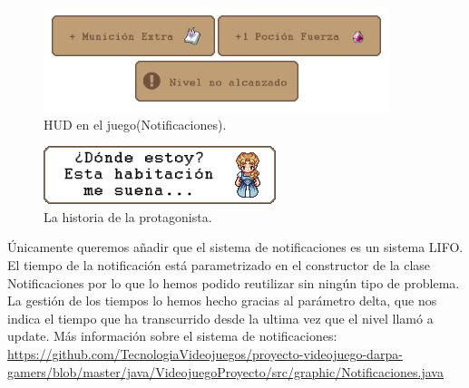 \begin{figure}[!htb]
  \centering
    \includegraphics{./img/8.JPG}
    \caption{HUD en el juego(Notificaciones).}
  \label{fig:yo}
\end{figure}
\begin{figure}[!htb]
  \centering
    \includegraphics{./img/Dialogo1.png}
    \caption{ La historia de la protagonista.}
  \label{fig:yo}
\end{figure}
Únicamente queremos añadir que el sistema de notificaciones es un sistema LIFO. El tiempo de la notificación está parametrizado en el constructor de la clase Notificaciones por lo que lo hemos podido reutilizar sin ningún tipo de problema. La gestión de los tiempos lo hemos hecho gracias al parámetro delta, que nos indica el tiempo que ha transcurrido desde la ultima vez que el nivel llamó a update.\newline
\newline
Más información sobre el sistema de notificaciones:\newline
\url{https://github.com/TecnologiaVideojuegos/proyecto-videojuego-darpa-gamers/blob/master/java/VideojuegoProyecto/src/graphic/Notificaciones.java}
\newpage
